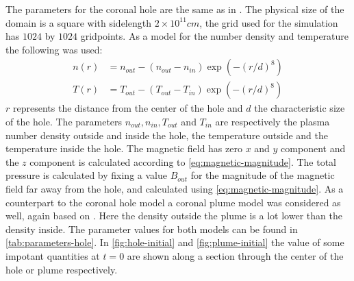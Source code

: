 The parameters for the coronal hole are the same as in \cite{coronal-hole}. 
The physical size of the domain is a square with sidelength $2\times 10^{11}cm$, the grid used for the simulation has $1024$ by $1024$ gridpoints. As a model for the number density and temperature the following was used:
\begin{equation}
	\label{eq:hole-model}
	\begin{split}
		n(r) &= n_{out} - (n_{out}-n_{in})\exp \left( -(r/d)^8 \right)\\
		T(r) &= T_{out} - (T_{out}-T_{in})\exp \left( -(r/d)^8 \right) 
	\end{split}
\end{equation}
$r$ represents the distance from the center of the hole and $d$ the characteristic size of the hole. 
The parameters $n_{out}, n_{in}, T_{out}$ and $T_{in}$ are respectively the plasma number density outside and inside the hole, the temperature outside and the temperature inside the hole. 
The magnetic field has zero $x$ and $y$ component and the $z$ component is calculated according to \cref{eq:magnetic-magnitude}.
The total pressure is calculated by fixing a value $B_{out}$ for the magnitude of the magnetic field far away from the hole, and calculated using \cref{eq:magnetic-magnitude}.
As a counterpart to the coronal hole model a coronal plume model was considered as well, again based on \cite{coronal-hole}.
Here the density outside the plume is a lot lower than the density inside.
The parameter values for both models can be found in \cref{tab:parameters-hole}.
In \cref{fig:hole-initial} and \cref{fig:plume-initial} the value of some impotant quantities at $t=0$ are shown along a section through the center of the hole or plume respectively.

